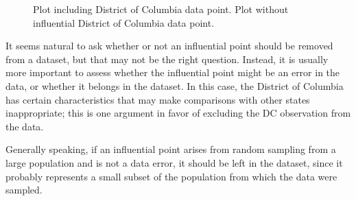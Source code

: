 \begin{figure}[h!]
	\centering
	\caption{ Plot including District of Columbia data point.  Plot without influential District of Columbia data point.}
	\label{infMortUS}
\end{figure}	

It seems natural to ask whether or not an influential point should be removed from a dataset, but that may not be the right question. Instead, it is usually more important to assess whether the influential point might be an error in the data, or whether it belongs in the dataset. In this case, the District of Columbia has certain characteristics that may make comparisons with other states inappropriate; this is one argument in favor of excluding the DC observation from the data. 

Generally speaking, if an influential point arises from random sampling from a large population and is not a data error, it should be left in the dataset, since it probably represents a small subset of the population from which the data were sampled. 

